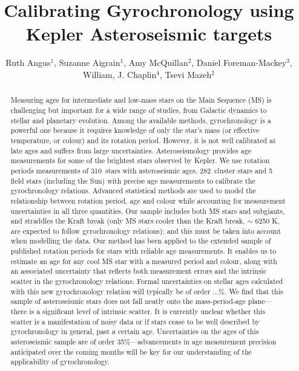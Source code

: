 \documentclass[10pt,preprint]{aastex}
\newcommand{\nastero}{310~}
\newcommand{\ncluster}{282~}
\begin{document}
\title{Calibrating Gyrochronology using Kepler Asteroseismic targets}

\author{Ruth Angus$^1$, Suzanne Aigrain$^1$, Amy McQuillan$^2$, Daniel Foreman-Mackey$^3$,  William, J. Chaplin$^4$, Tsevi Mazeh$^2$}

\begin{abstract}
\label{abs}

Measuring ages for intermediate and low-mass stars on the Main Sequence (MS) is challenging but important for a wide range of studies, from Galactic dynamics to stellar and planetary evolution.
Among the available methods, gyrochronology is a powerful one because it requires knowledge of only the star's mass (or effective temperature, or colour) and its rotation period.
However, it is not well calibrated at late ages and suffers from large uncertainties.
Asteroseismology provides age measurements for some of the brightest stars observed by Kepler.
We use rotation periods measurements of \nastero stars with asteroseismic ages, \ncluster cluster stars and 5 field stars (including the Sun) with precise age measurements to calibrate the gyrochronology relations.
Advanced statistical methods are used to model the relationship between rotation period, age and colour while accounting for measurement uncertainties in all three quantities.
Our sample includes both MS stars and subgiants, and straddles the Kraft break (only MS stars cooler than the Kraft break, $\sim$ 6250 K, are expected to follow gyrochronology relations); and this must be taken into account when modelling the data.
Our method has been applied to the extended sample of published rotation periods for stars with reliable age measurements.
It enables us to estimate an age for any cool MS star with a measured period and colour, along with an associated uncertainty that reflects both measurement errors and the intrinsic scatter in the gyrochronology relations.
Formal uncertainties on stellar ages calculated with this new gyrochronology relation will typically be of order ...\%.
We find that this sample of asteroseismic stars does not fall neatly onto the mass-period-age plane---there is a significant level of intrinsic scatter.
It is currently unclear whether this scatter is a manifestation of noisy data or if stars cease to be well described by gyrochronology in general, past a certain age.
Uncertainties on the ages of this asteroseismic sample are of order 35\%---advancements in age measurement precision anticipated over the coming months will be key for our understanding of the applicability of gyrochronology.

\end{abstract}
\end{document}

